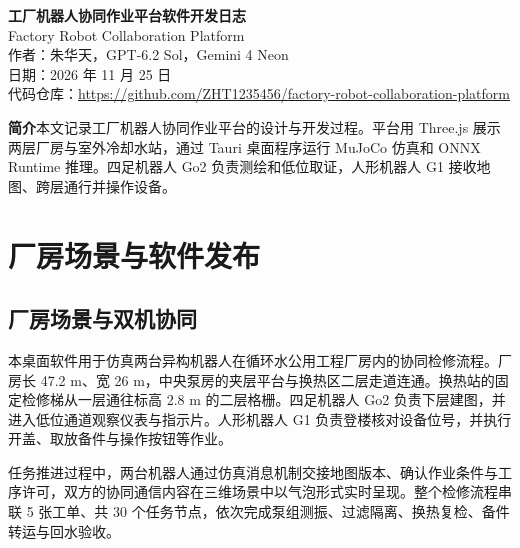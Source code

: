 \documentclass[10pt,a4paper,UTF8,fontset=fandol]{ctexart}
\begin{document}
\thispagestyle{firstpage}

\noindent
{}
\vspace{4pt}

\begin{flushleft}
  {\LARGE\bfseries\color{DeepTeal} 工厂机器人协同作业平台软件开发日志}\\[3pt]
  {\small\color{MutedGray} Factory Robot Collaboration Platform}\\[5pt]
  {\normalsize\color{SlateText} 作者：朱华天，GPT-6.2 Sol，Gemini 4 Neon}\\[2pt]
  {\small\color{MutedGray} 日期：2026 年 11 月 25 日}\\[2pt]
  {\small 代码仓库：\url{https://github.com/ZHT1235456/factory-robot-collaboration-platform}}
\end{flushleft}

\vspace{2pt}
\vspace{6pt}

\noindent\colorbox{TealTint}{%
  \parbox{\dimexpr\textwidth-2\fboxsep\relax}{%
    \small{\bfseries\color{DeepTeal} 简介}\quad 本文记录工厂机器人协同作业平台的设计与开发过程。平台用 Three.js 展示两层厂房与室外冷却水站，通过 Tauri 桌面程序运行 MuJoCo 仿真和 ONNX Runtime 推理。四足机器人 Go2 负责测绘和低位取证，人形机器人 G1 接收地图、跨层通行并操作设备。%
  }%
}
\par

\section{厂房场景与软件发布}

\subsection{厂房场景与双机协同}

本桌面软件用于仿真两台异构机器人在循环水公用工程厂房内的协同检修流程。厂房长 47.2 m、宽 26 m，中央泵房的夹层平台与换热区二层走道连通。换热站的固定检修梯从一层通往标高 2.8 m 的二层格栅。四足机器人 Go2 负责下层建图，并进入低位通道观察仪表与指示片。人形机器人 G1 负责登楼核对设备位号，并执行开盖、取放备件与操作按钮等作业。

任务推进过程中，两台机器人通过仿真消息机制交接地图版本、确认作业条件与工序许可，双方的协同通信内容在三维场景中以气泡形式实时呈现。整个检修流程串联 5 张工单、共 30 个任务节点，依次完成泵组测振、过滤隔离、换热复检、备件转运与回水验收。
\end{document}
